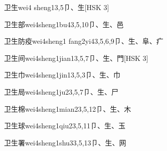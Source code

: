 \begin{EntryWithPhonetic}{卫生}{wei4 sheng1}{3,5}{⼙、⽣}[HSK 3]
\end{EntryWithPhonetic}

\begin{EntryWithPhonetic}{卫生部}{wei4sheng1bu4}{3,5,10}{⼙、⽣、⾢}
\end{EntryWithPhonetic}

\begin{EntryWithPhonetic}{卫生防疫}{wei4sheng1 fang2yi4}{3,5,6,9}{⼙、⽣、⾩、⽧}
\end{EntryWithPhonetic}

\begin{EntryWithPhonetic}{卫生间}{wei4sheng1jian1}{3,5,7}{⼙、⽣、⾨}[HSK 3]
\end{EntryWithPhonetic}

\begin{EntryWithPhonetic}{卫生巾}{wei4sheng1jin1}{3,5,3}{⼙、⽣、⼱}
\end{EntryWithPhonetic}

\begin{EntryWithPhonetic}{卫生局}{wei4sheng1ju2}{3,5,7}{⼙、⽣、⼫}
\end{EntryWithPhonetic}

\begin{EntryWithPhonetic}{卫生棉}{wei4sheng1mian2}{3,5,12}{⼙、⽣、⽊}
\end{EntryWithPhonetic}

\begin{EntryWithPhonetic}{卫生球}{wei4sheng1qiu2}{3,5,11}{⼙、⽣、⽟}
\end{EntryWithPhonetic}

\begin{EntryWithPhonetic}{卫生署}{wei4sheng1shu3}{3,5,13}{⼙、⽣、⽹}
\end{EntryWithPhonetic}

